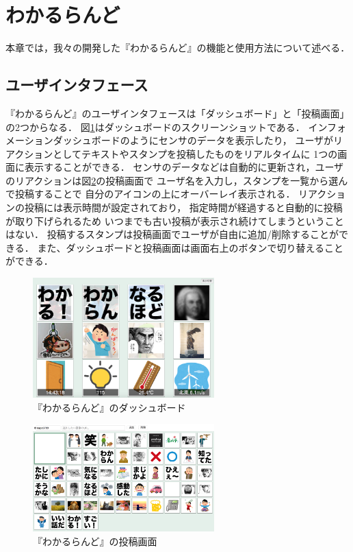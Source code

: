 \section{わかるらんど}
本章では，我々の開発した『わかるらんど』の機能と使用方法について述べる．

\subsection{ユーザインタフェース}
『わかるらんど』のユーザインタフェースは「ダッシュボード」と「投稿画面」の2つからなる．
図\ref{dashboard}はダッシュボードのスクリーンショットである．
インフォメーションダッシュボードのようにセンサのデータを表示したり，
ユーザがリアクションとしてテキストやスタンプを投稿したものをリアルタイムに
1つの画面に表示することができる．
センサのデータなどは自動的に更新され，ユーザのリアクションは図\ref{console}の投稿画面で
ユーザ名を入力し，スタンプを一覧から選んで投稿することで
自分のアイコンの上にオーバーレイ表示される．
リアクションの投稿には表示時間が設定されており，
指定時間が経過すると自動的に投稿が取り下げられるため
いつまでも古い投稿が表示され続けてしまうということはない．
投稿するスタンプは投稿画面でユーザが自由に追加/削除することができる．
また、ダッシュボードと投稿画面は画面右上のボタンで切り替えることができる．

\begin{figure}[h]
\centering
\includegraphics[width=7cm]{images/dashboard.png}
\caption{『わかるらんど』のダッシュボード}
\label{dashboard}
\end{figure}

\begin{figure}[h]
\centering
\includegraphics[width=7cm]{images/console.png}
\caption{『わかるらんど』の投稿画面}
\label{console}
\end{figure}

